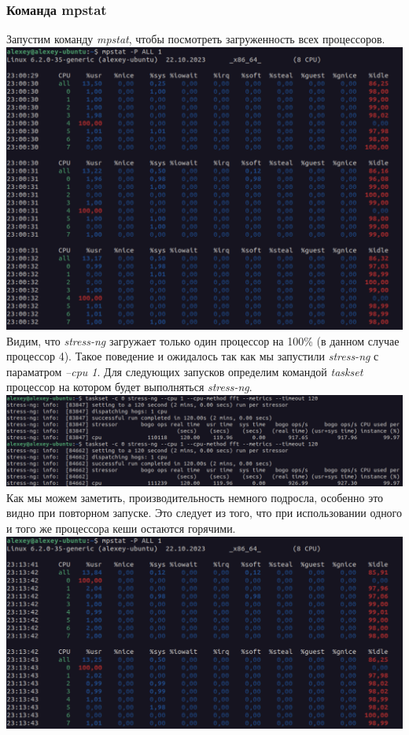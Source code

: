 \subsubsection{Команда mpstat}
Запустим команду \textit{mpstat}, чтобы посмотреть загруженность всех процессоров.\\
\includegraphics[width=\textwidth]{image/mpstat.png}
Видим, что \textit{stress-ng} загружает только один процессор на 100\% (в данном случае процессор 4).
Такое поведение и ожидалось так как мы запустили \textit{stress-ng} с параматром \textit{--cpu 1}.
Для следующих запусков определим командой \textit{taskset} процессор на котором будет выполняться \textit{stress-ng}.\\
\includegraphics[width=\textwidth]{image/taskset.png}
Как мы можем заметить, производительность немного подросла, особенно это видно при повторном запуске. Это следует из того, что при использовании одного и того же процессора кеши остаются горячими.\\ 
\includegraphics[width=\textwidth]{image/mpstat2.png}

